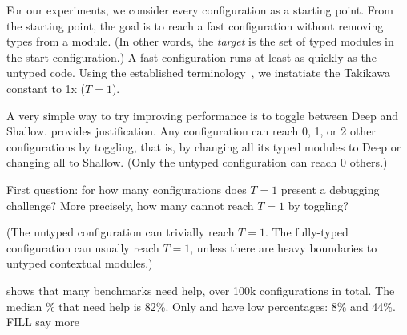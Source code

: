 For our experiments, we consider every configuration as a starting point.
From the starting point, the goal is to reach a fast configuration without
removing types from a module.
(In other words, the \emph{target} is the set of typed modules in the start
configuration.)
A fast configuration runs at least as quickly as the untyped code.
Using the established terminology~\cite{vss-popl-2017,bbst-oopsla-2017},
we instatiate the Takikawa constant to 1x ($T=1$).

A very simple way to try improving performance is to toggle between
Deep and Shallow.
\citet{g-pldi-2022} provides justification.
Any configuration can reach 0, 1, or 2 other configurations by
toggling, that is, by changing all its typed modules to Deep or
changing all to Shallow.
(Only the untyped configuration can reach 0 others.)

First question: for how many configurations does $T=1$ present a debugging challenge?
More precisely, how many cannot reach $T=1$ by toggling?

(The untyped configuration can trivially reach $T=1$.
The fully-typed configuration can usually reach $T=1$, unless there are heavy
boundaries to untyped contextual modules.)

 shows that many benchmarks need help,
over 100k configurations in total.
The median \% that need help is 82\%.
Only  and  have low percentages: 8\% and 44\%.
FILL say more

